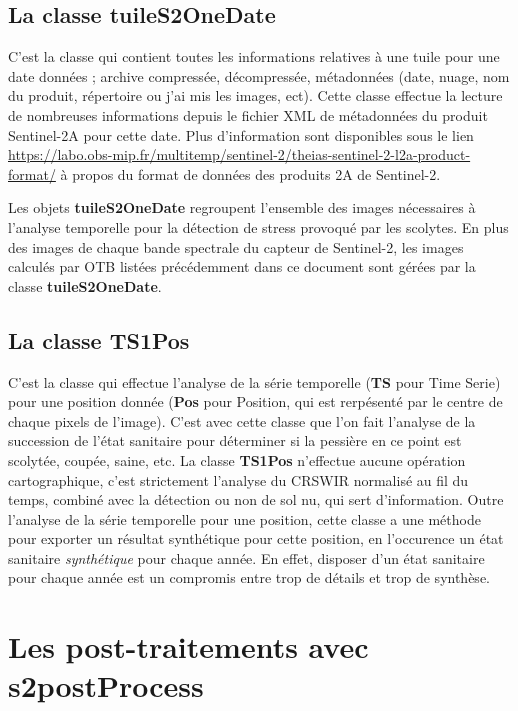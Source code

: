 \documentclass[a4paper, 12pt]{article} %
\begin{document}
\subsection{La classe \textbf{tuileS2OneDate}}
C'est la classe qui contient toutes les informations relatives à une tuile pour une date données ; archive compressée, décompressée, métadonnées (date, nuage, nom du produit, répertoire ou j'ai mis les images, ect). Cette classe effectue la lecture de nombreuses informations depuis le fichier XML de métadonnées du produit Sentinel-2A pour cette date. Plus d'information sont disponibles sous le lien \url{https://labo.obs-mip.fr/multitemp/sentinel-2/theias-sentinel-2-l2a-product-format/} à propos du format de données des produits 2A de Sentinel-2.

Les objets \textbf{tuileS2OneDate} regroupent l'ensemble des images nécessaires à l'analyse temporelle pour la détection de stress provoqué par les scolytes. En plus des images de chaque bande spectrale du capteur de Sentinel-2, les images calculés par OTB listées précédemment dans ce document sont gérées par la classe \textbf{tuileS2OneDate}.

\subsection{La classe \textbf{TS1Pos}}
C'est la classe qui effectue l'analyse de la série temporelle (\textbf{TS} pour Time Serie) pour une position donnée (\textbf{Pos} pour Position, qui est rerpésenté par le centre de chaque pixels de l'image). C'est avec cette classe que l'on fait l'analyse de la succession de l'état sanitaire pour déterminer si la pessière en ce point est scolytée, coupée, saine, etc. La classe \textbf{TS1Pos} n'effectue aucune opération cartographique, c'est strictement l'analyse du CRSWIR normalisé au fil du temps, combiné avec la détection ou non de sol nu, qui sert d'information. Outre l'analyse de la série temporelle pour une position, cette classe a une méthode pour exporter un résultat synthétique pour cette position, en l'occurence un état sanitaire \textit{synthétique} pour chaque année. En effet, disposer d'un état sanitaire pour chaque année est un compromis entre trop de détails et trop de synthèse.


\section{Les post-traitements avec s2{\textunderscore}postProcess}
\end{document}
